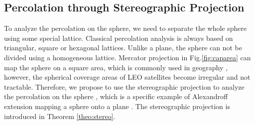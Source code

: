 \documentclass[final]{IEEEtran}
\begin{document}
\subsection{Percolation through Stereographic Projection}
\indent To analyze the percolation on the sphere, we need to separate the whole sphere using some special lattice. Classical percolation analysis is always based on triangular, square or hexagonal lattices. Unlike a plane, the sphere can not be divided using a homogeneous lattice. Mercator projection in Fig.\ref{fig:caparea} can map the sphere on a square area, which is commonly used in geography \cite{snyder1987map}, however, the spherical coverage areas of LEO satellites become irregular and not tractable. Therefore, we propose to use the stereographic projection to analyze the percolation on the sphere \cite{snyder1987map}, which is a specific example of Alexandroff extension mapping a sphere onto a plane \cite{willard2012general}. The stereographic projection is introduced in Theorem \ref{theo:stereo}.
\end{document}
